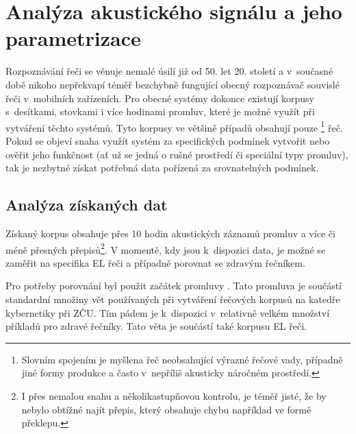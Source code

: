 \section{Analýza akustického signálu a jeho parametrizace}
\label{chap:construction:analysis}

Rozpoznávání řeči se věnuje nemalé úsilí již od 50. let 20. století a v~současné době nikoho nepřekvapí téměř bezchybně fungující obecný rozpoznávač souvislé řeči v~mobilních zařízeních.
Pro obecné systémy dokonce existují korpusy s~desítkami, stovkami i více hodinami promluv, které je možné využít při vytváření těchto systémů.
Tyto korpusy ve většině případů obsahují pouze \footnote{Slovním spojením  je myšlena řeč neobsahující výrazné řečové vady, případně jiné formy produkce a často v~nepříliš akusticky náročném prostředí.} řeč.
Pokud se objeví snaha využít systém za specifických podmínek vytvořit nebo ověřit jeho funkčnost (ať už se jedná o rušné prostředí či speciální typy promluv), tak je nezbytné získat potřebná data pořízená za srovnatelných podmínek.

\subsection{Analýza získaných dat}
\label{chap:construction:analysis:data}

Získaný korpus obsahuje přes 10 hodin akustických záznamů promluv a více či méně přesných přepisů\footnote{I přes nemalou snahu a několikastupňovou kontrolu, je téměř jisté, že by nebylo obtížné najít přepis, který obsahuje chybu například ve formě překlepu.}.
V momentě, kdy jsou  k~dispozici data, je možné se zaměřit na specifika EL řeči a případně porovnat se zdravým řečníkem.

Pro potřeby porovnání byl použit začátek promluvy \textit{}.
Tato promluva je součástí standardní množiny vět používaných při vytváření řečových korpusů na katedře kybernetiky při ZČU.
Tím pádem je  k~dispozici v~relativně velkém množství příkladů pro zdravé řečníky. Tato věta je součástí také korpusu EL řeči.

